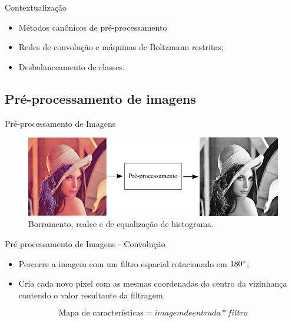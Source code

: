 \documentclass{beamer}
\begin{document}
\begin{frame}{Contextualização}
\begin{itemize}
    \item Métodos canônicos de pré-processamento
    \item Redes de convolução e máquinas de Boltzmann restritas;
    \item Desbalanceamento de classes.
\end{itemize}
\end{frame}
\subsection{Pré-processamento de imagens}
\begin{frame}{Pré-processamento de Imagens}
\begin{figure}[htbp]
 \begin{center}
   \includegraphics[width=1\linewidth]{figuras/preprocessamento.png}
 \caption{Borramento, realce e de equalização de histograma.}
 \end{center}
\end{figure}
\end{frame}
\begin{frame}{Pré-processamento de Imagens - Convolução}
\begin{itemize}
    \item Percorre a imagem com um filtro espacial rotacionado em $180\degree$; \\
    \item Cria cada novo pixel com as mesmas coordenadas do centro da vizinhança contendo o valor resultante da filtragem.
\end{itemize}
\begin{equation}
\text{Mapa de características} = imagem de entrada * filtro
\end{equation}
\end{frame}
\end{document}
